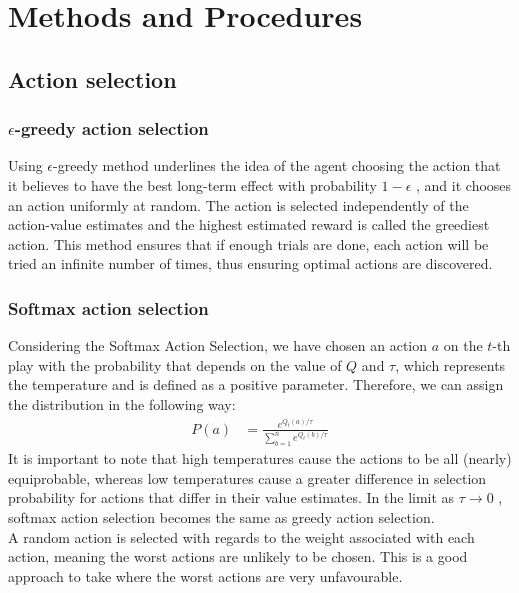 \documentclass[paper=a4, fontsize=11pt]{scrartcl}
\numberwithin{equation}{section}		%
\numberwithin{figure}{section}			%
\numberwithin{table}{section}				%
\begin{document}

\section{Methods and Procedures}
\label{methods}
\subsection{\textbf {Action selection}}
\subsubsection*{$\epsilon$-greedy action selection}
Using $\epsilon$-greedy method underlines the idea of the agent choosing the action that it believes to have the best long-term effect with probability $1-\epsilon$ , and it chooses an action uniformly at random. The action is selected independently of the action-value estimates and the highest estimated reward is called the greediest action. This method ensures that if enough trials are done, each action will be tried an infinite number of times, thus ensuring optimal actions are discovered.

\subsubsection*{Softmax action selection}
Considering the Softmax Action Selection,  we have chosen an action $a$ on the $t$-th play with the probability that depends on the value of $Q$ and $\tau$, which represents the temperature and is defined as a positive parameter. Therefore, we can assign the distribution in the following way:
\begin{align}
P(a) &= \frac{e^{Q_t(a)/\tau}}{\sum_{b=1}^{n} e^{Q_t(b)/\tau}}
\end{align}
It is important to note that high temperatures cause the actions to be all (nearly) equiprobable, whereas low temperatures cause a greater difference in selection probability for actions that differ in their value estimates. In the limit as $\tau \to 0 $  , softmax action selection becomes the same as greedy action selection. \\
A random action is selected with regards to the weight associated with each action, meaning the worst actions are unlikely to be chosen. This is a good approach to take where the worst actions are very unfavourable.\\
\end{document}
